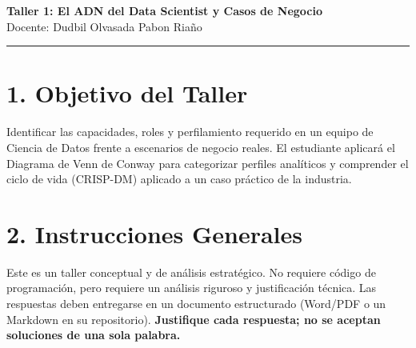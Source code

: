 \documentclass[12pt,a4paper]{article}
\begin{document}
\begin{center}
    {\huge \textcolor{unabblue}{\textbf{Taller 1: El ADN del Data Scientist y Casos de Negocio}}} \\[0.5cm]
    {\large Docente: Dudbil Olvasada Pabon Riaño} \\[0.2cm]
    \rule{\textwidth}{1pt}
\end{center}

\vspace{0.5cm}

\section*{\textcolor{unabblue}{1. Objetivo del Taller}}
Identificar las capacidades, roles y perfilamiento requerido en un equipo de Ciencia de Datos frente a escenarios de negocio reales. El estudiante aplicará el Diagrama de Venn de Conway para categorizar perfiles analíticos y comprender el ciclo de vida (CRISP-DM) aplicado a un caso práctico de la industria.

\section*{\textcolor{unabblue}{2. Instrucciones Generales}}
Este es un taller conceptual y de análisis estratégico. No requiere código de programación, pero requiere un análisis riguroso y justificación técnica. Las respuestas deben entregarse en un documento estructurado (Word/PDF o un Markdown en su repositorio). \textbf{Justifique cada respuesta; no se aceptan soluciones de una sola palabra.}

\vspace{0.5cm}
\noindent{}
\vspace{0.5cm}
\end{document}
